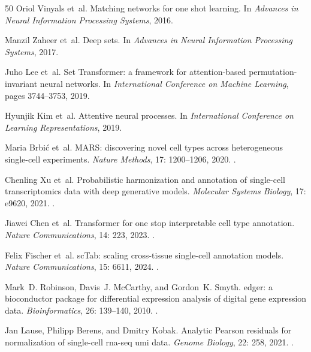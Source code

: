 \documentclass[12pt]{article}
\begin{document}
\begin{thebibliography}{50}
Oriol Vinyals et~al.
\newblock Matching networks for one shot learning.
\newblock In \emph{Advances in Neural Information Processing Systems}, 2016.

Manzil Zaheer et~al.
\newblock Deep sets.
\newblock In \emph{Advances in Neural Information Processing Systems}, 2017.

Juho Lee et~al.
\newblock Set Transformer: a framework for attention-based permutation-invariant neural networks.
\newblock In \emph{International Conference on Machine Learning}, pages 3744--3753, 2019.

Hyunjik Kim et~al.
\newblock Attentive neural processes.
\newblock In \emph{International Conference on Learning Representations}, 2019.

Maria Brbi{\'c} et~al.
\newblock MARS: discovering novel cell types across heterogeneous single-cell experiments.
\newblock \emph{Nature Methods}, 17: 1200--1206, 2020.
\newblock {}.

Chenling Xu et~al.
\newblock Probabilistic harmonization and annotation of single-cell transcriptomics data with deep generative models.
\newblock \emph{Molecular Systems Biology}, 17: e9620, 2021.
\newblock {}.

Jiawei Chen et~al.
\newblock Transformer for one stop interpretable cell type annotation.
\newblock \emph{Nature Communications}, 14: 223, 2023.
\newblock {}.

Felix Fischer et~al.
\newblock scTab: scaling cross-tissue single-cell annotation models.
\newblock \emph{Nature Communications}, 15: 6611, 2024.
\newblock {}.


Mark~D. Robinson, Davis~J. McCarthy, and Gordon~K. Smyth.
\newblock edger: a bioconductor package for differential expression analysis of digital gene expression data.
\newblock \emph{Bioinformatics}, 26: 139--140, 2010.
\newblock {}.

Jan Lause, Philipp Berens, and Dmitry Kobak.
\newblock Analytic Pearson residuals for normalization of single-cell rna-seq umi data.
\newblock \emph{Genome Biology}, 22: 258, 2021.
\newblock {}.


\end{thebibliography}
\end{document}
